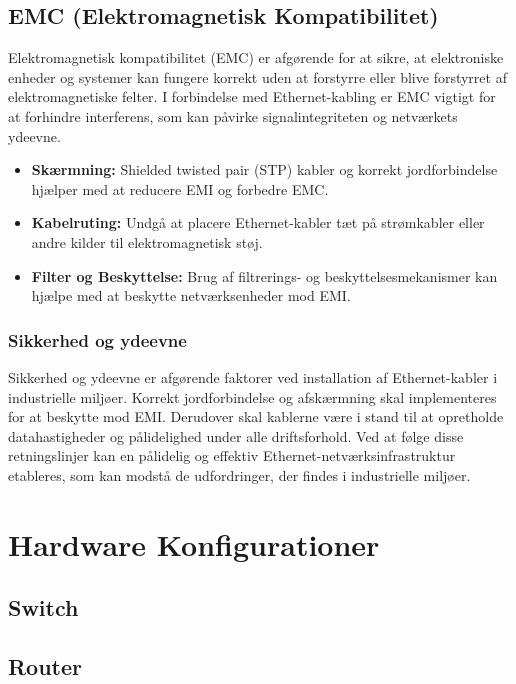 \section{EMC (Elektromagnetisk Kompatibilitet)}
Elektromagnetisk kompatibilitet (EMC) er afgørende for at sikre, at elektroniske enheder og systemer kan fungere korrekt uden at forstyrre eller blive forstyrret af elektromagnetiske felter. I forbindelse med Ethernet-kabling er EMC vigtigt for at forhindre interferens, som kan påvirke signalintegriteten og netværkets ydeevne.
\begin{itemize}
	\item \textbf{Skærmning:} Shielded twisted pair (STP) kabler og korrekt jordforbindelse hjælper med at reducere EMI og forbedre EMC.
	\item \textbf{Kabelruting:} Undgå at placere Ethernet-kabler tæt på strømkabler eller andre kilder til elektromagnetisk støj.
	\item \textbf{Filter og Beskyttelse:} Brug af filtrerings- og beskyttelsesmekanismer kan hjælpe med at beskytte netværksenheder mod EMI.
\end{itemize}

\subsection{Sikkerhed og ydeevne}
Sikkerhed og ydeevne er afgørende faktorer ved installation af Ethernet-kabler i industrielle miljøer. Korrekt jordforbindelse og afskærmning skal implementeres for at beskytte mod EMI. Derudover skal kablerne være i stand til at opretholde datahastigheder og pålidelighed under alle driftsforhold.
\newline\newline\noindent 
Ved at følge disse retningslinjer kan en pålidelig og effektiv 
\newline\noindent Ethernet-netværksinfrastruktur etableres, som kan modstå de udfordringer, der findes i industrielle miljøer.

\chapter{Hardware Konfigurationer}
\section{Switch}
\section{Router}
